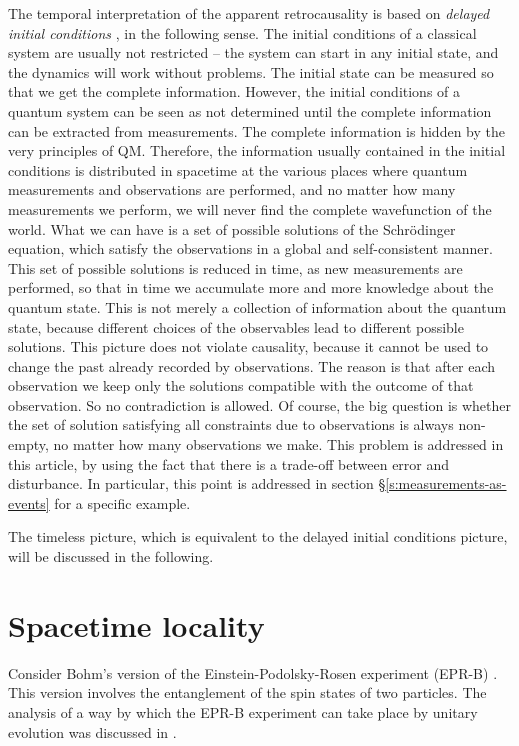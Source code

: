 \documentclass[12pt]{amsart}
\theoremstyle{definition}
\theoremstyle{plain}
\begin{document}
The temporal interpretation of the apparent retrocausality is based on \emph{delayed initial conditions} \cite{Sto08f,Sto12QMc,Sto13bSpringer}, in the following sense. The initial conditions of a classical system are usually not restricted -- the system can start in any initial state, and the dynamics will work without problems. The initial state can be measured so that we get the complete information. However, the initial conditions of a quantum system can be seen as not determined until the complete information can be extracted from measurements. The complete information is hidden by the very principles of QM. Therefore, the information usually contained in the initial conditions is distributed in spacetime at the various places where quantum measurements and observations are performed, and no matter how many measurements we perform, we will never find the complete wavefunction of the world. What we can have is a set of possible solutions of the Schr\"odinger equation, which satisfy the observations in a global and self-consistent manner. This set of possible solutions is reduced in time, as new measurements are performed, so that in time we accumulate more and more knowledge about the quantum state. This is not merely a collection of information about the quantum state, because different choices of the observables lead to different possible solutions.
This picture does not violate causality, because it cannot be used to change the past already recorded by observations. The reason is that after each observation we keep only the solutions compatible with the outcome of that observation. So no contradiction is allowed. Of course, the big question is whether the set of solution satisfying all constraints due to observations is always non-empty, no matter how many observations we make. This problem is addressed in this article, by using the fact that there is a trade-off between error and disturbance. In particular, this point is addressed in section \S\ref{s:measurements-as-events} for a specific example.

The timeless picture, which is equivalent to the delayed initial conditions picture, will be discussed in the following.


\section{Spacetime locality}
\label{s:spacetime_locality}

Consider Bohm's version of the Einstein-Podolsky-Rosen experiment (EPR-B) \cite{EPR35,Bel64}. This version involves the entanglement of the spin states of two particles. The analysis of a way by which the EPR-B experiment can take place by unitary evolution was discussed in \cite{Sto08b,Sto08f,Sto12QMc}.
\end{document}
